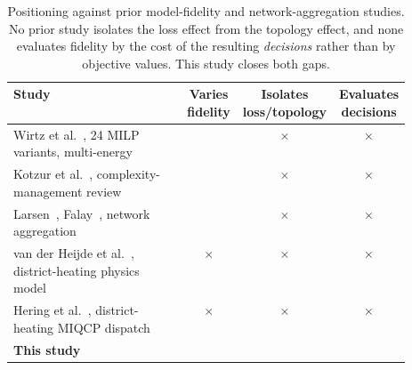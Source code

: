 \documentclass[a4paper,fleqn]{cas-sc}
\renewcommand{\checkmark}{\ding{51}}
\begin{document}
\begin{table}[t]
\centering
\small
\caption{Positioning against prior model-fidelity and network-aggregation studies. No prior
study isolates the loss effect from the topology effect, and none evaluates fidelity by the
cost of the resulting \emph{decisions} rather than by objective values. This study closes both
gaps.}
\label{tab:priorwork}
\setlength{\tabcolsep}{5pt}
\begin{tabular}{@{}p{0.52\linewidth}ccc@{}}
\toprule
Study & \makecell{Varies\\fidelity} & \makecell{Isolates\\loss/topology} & \makecell{Evaluates\\decisions} \\
\midrule
Wirtz et al.~\cite{Wirtz2021_complexity}, 24 MILP variants, multi-energy & \checkmark & $\times$ & $\times$ \\
Kotzur et al.~\cite{Kotzur2021}, complexity-management review & \checkmark & $\times$ & $\times$ \\
Larsen~\cite{Larsen2004}, Falay~\cite{Falay2020}, network aggregation & \checkmark & $\times$ & $\times$ \\
van der Heijde et al.~\cite{vanderHeijde2017}, district-heating physics model & $\times$ & $\times$ & $\times$ \\
Hering et al.~\cite{Hering2021}, district-heating MIQCP dispatch & $\times$ & $\times$ & $\times$ \\
\textbf{This study} & \checkmark & \checkmark & \checkmark \\
\bottomrule
\end{tabular}
\end{table}
\end{document}
